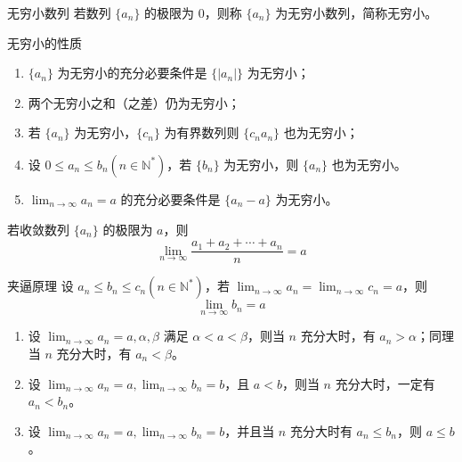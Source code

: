 \begin{definition}{无穷小数列}
    若数列 $\{a_n\}$ 的极限为 $0$，则称 $\{a_n\}$ 为无穷小数列，简称无穷小。
\end{definition}

\begin{theorem}{无穷小的性质}
    \begin{enumerate}
        \item $\{a_n\}$ 为无穷小的充分必要条件是 $\{|a_n|\}$ 为无穷小；
        \item 两个无穷小之和（之差）仍为无穷小；
        \item 若 $\{a_n\}$ 为无穷小，$\{c_n\}$ 为有界数列则 $\{c_{n}a_{n}\}$ 也为无穷小；
        \item 设 $0 \leqslant a_n \leqslant b_n(n \in \mathbb{N}^{*})$，若 $\{b_n\}$ 为无穷小，则 $\{a_n\}$ 也为无穷小。
        \item $\displaystyle \lim_{n \to \infty}a_n = a$ 的充分必要条件是 $\{a_n - a\}$ 为无穷小。
    \end{enumerate}
\end{theorem}

\hfill

\begin{example}
    若收敛数列 $\{a_n\}$ 的极限为 $a$，则
    \[\lim_{n \to \infty}\frac{a_1 + a_2 + \cdots + a_n}{n} = a\]
\end{example}

\hfill

\begin{theorem}{夹逼原理}
    设 $a_n \leqslant b_n \leqslant  c_n(n \in \mathbb{N}^{*})$，若 $\displaystyle \lim_{n \to \infty}a_n = \lim_{n \to \infty}c_n = a$，则
    \[\lim_{n \to \infty}b_n = a\]
\end{theorem}

\begin{theorem}
    \begin{enumerate}
        \item 设 $\displaystyle \lim_{n \to \infty}a_n = a, \alpha, \beta$ 满足 $\alpha < a < \beta$，则当 $n$ 充分大时，有 $a_n > \alpha$；同理当 $n$ 充分大时，有 $a_n < \beta$。
        \item 设 $\displaystyle \lim_{n \to \infty}a_n = a, \lim_{n \to \infty}b_n = b$，且 $a < b$，则当 $n$ 充分大时，一定有 $a_n < b_n$。
        \item 设 $\displaystyle \lim_{n \to \infty}a_n = a, \lim_{n \to \infty}b_n = b$，并且当 $n$ 充分大时有 $a_n \leqslant  b_n$，则 $a \leqslant b$。

    \end{enumerate}
\end{theorem}


